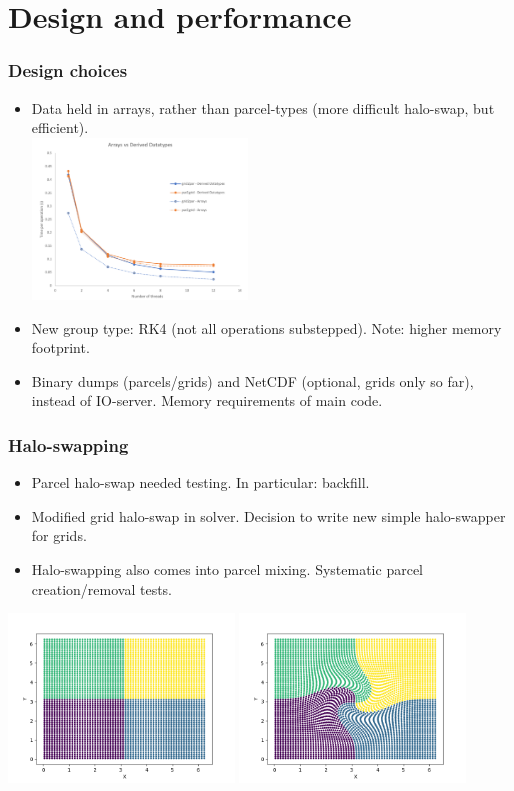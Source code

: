 \documentclass{beamer}
\begin{document}
\section{Design and performance}

\begin{frame}
\frametitle{Design choices}
\begin{itemize}
\item Data held in arrays, rather than parcel-types (more difficult halo-swap, but efficient). \\
\includegraphics[width=0.45\textwidth]{pmpic_images/grid2par.png} 
\item New group type: RK4 (not all operations substepped). Note: higher memory footprint.
\item Binary dumps (parcels/grids) and NetCDF (optional, grids only so far), instead of IO-server. Memory requirements of main code.
\end{itemize}

\end{frame}

\begin{frame}
\frametitle{Halo-swapping}
\begin{itemize}
\item Parcel halo-swap needed testing. In particular: backfill.
\item Modified grid halo-swap in solver. Decision to write new simple halo-swapper for grids. 
\item Halo-swapping also comes into parcel mixing. Systematic parcel creation/removal tests.
\end{itemize}

\includegraphics[width=0.45\textwidth]{pmpic_images/vel0.png} 
\includegraphics[width=0.45\textwidth]{pmpic_images/vel1.png} 

\end{frame}
\end{document}

